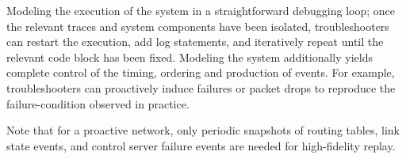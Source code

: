 Modeling the execution of the system in a straightforward debugging loop; once the 
relevant traces and system components have been isolated, troubleshooters can
restart the execution, add log statements, and iteratively repeat until the
relevant code block has been fixed. Modeling the system additionally
yields complete control of the timing, ordering and production of events.
For example, troubleshooters can proactively induce failures or packet drops
to reproduce the failure-condition observed in practice.

 Note that for a proactive
network, only periodic snapshots of routing tables, link state events, and
control server failure events are needed for high-fidelity replay.



